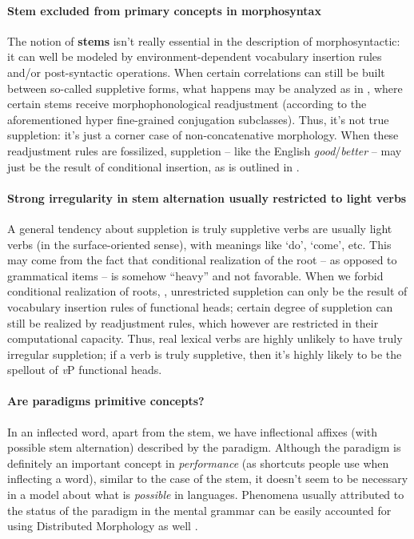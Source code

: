 \documentclass[a4paper, oneside, 12pt]{report}
\newcommand*{\concept}[1]{\textbf{#1}}
\newcommand{\form}[1]{\emph{#1}}
\newcommand{\translate}[1]{`#1'}
\newcommand{\vP}{\textit{v}P}
\begin{document}
{\paragraph{Stem excluded from primary concepts in morphosyntax} 
The notion of \concept{stems} isn't really essential in the description of morphosyntactic:
it can well be modeled by environment-dependent vocabulary insertion rules 
and/or post-syntactic operations.
When certain correlations can still be built between so-called suppletive forms,
what happens may be analyzed as in \citet{embick2005status},
where certain stems receive morphophonological readjustment
(according to the aforementioned hyper fine-grained conjugation subclasses).
Thus, it's not true suppletion:
it's just a corner case of non-concatenative morphology.
When these readjustment rules are fossilized,
suppletion -- like the English \form{good}/\form{better} -- 
may just be the result of conditional insertion,
as is outlined in \citet{siddiqi2009syntax}.

\paragraph{Strong irregularity in stem alternation usually restricted to light verbs} 
A general tendency about suppletion
is truly suppletive verbs are usually light verbs 
(in the surface-oriented sense),
with meanings like \translate{do}, \translate{come}, etc.
This may come from the fact that conditional realization of the root -- 
as opposed to grammatical items --
is somehow ``heavy'' and not favorable.
When we forbid conditional realization of roots,
\citep{embick2005status},
unrestricted suppletion can only be the result of 
vocabulary insertion rules of functional heads;
certain degree of suppletion can still be realized by readjustment rules,
which however are restricted in their computational capacity.
Thus, real lexical verbs are highly unlikely to have truly irregular suppletion;
if a verb is truly suppletive,
then it's highly likely to be 
the spellout of \vP{} functional heads.

\paragraph{Are paradigms primitive concepts?} 
In an inflected word, apart from the stem, 
we have inflectional affixes (with possible stem alternation) described by the paradigm.
Although the paradigm is definitely an important concept 
in \emph{performance} (as shortcuts people use when inflecting a word),
similar to the case of the stem,
it doesn't seem to be necessary 
in a model about what is \emph{possible} in languages.
Phenomena usually attributed to the status of the paradigm in 
the mental grammar 
can be easily accounted for using Distributed Morphology as well 
\citep{embick2000features,bobaljik2002syncretism}.

}
\end{document}
